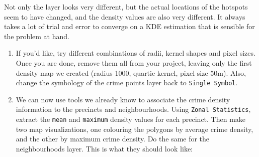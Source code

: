 \documentclass[
  letterpaper,
  DIV=11,
  numbers=noendperiod]{scrreprt}
\begin{document}
Not only the layer looks very different, but the actual locations of the
hotspots seem to have changed, and the density values are also very
different. It always takes a lot of trial and error to converge on a KDE
estimation that is sensible for the problem at hand.

\begin{enumerate}
\def\labelenumi{(\arabic{enumi})}
\setcounter{enumi}{336}
\item
  If you'd like, try different combinations of radii, kernel shapes and
  pixel sizes. Once you are done, remove them all from your project,
  leaving only the first density map we created (radius 1000, quartic
  kernel, pixel size 50m). Also, change the symbology of the crime
  points layer back to \texttt{Single\ Symbol}.
\item
  We can now use tools we already know to associate the crime density
  information to the precincts and neighbourhoods. Using
  \texttt{Zonal\ Statistics}, extract the \texttt{mean} and
  \texttt{maximum} density values for each precinct. Then make two map
  visualizations, one colouring the polygons by average crime density,
  and the other by maximum crime density. Do the same for the
  neighbourhoods layer. This is what they should look like:
\end{enumerate}
\end{document}
